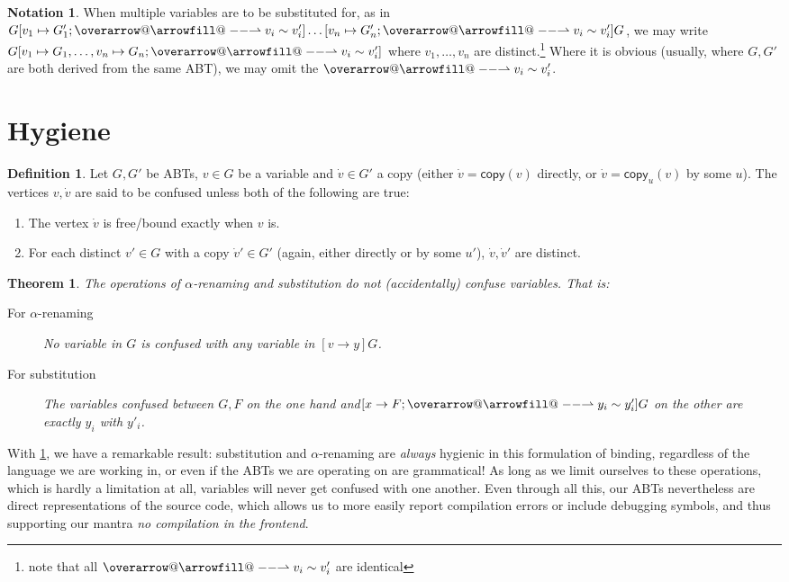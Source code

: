 \documentclass[11pt]{article} %
\makeatletter
\newtheorem{thm}{Theorem}
\theoremstyle{definition}
\newtheorem{dfn}{Definition}
\newtheorem*{ntn}{Notation}
\def\rightharpoonupfill@{\arrowfill@\relbar\relbar\rightharpoonup}
\newcommand{\harpvec}{%
   \mathpalette{\overarrow@\rightharpoonupfill@}}
\makeatother
\begin{document}
\begin{ntn}
When multiple variables are to be substituted for, as in $G[v_1 \mapsto G'_1; \harpvec{v_i \sim v'_i}]\ldots[v_n \mapsto G'_n; \harpvec{v_i \sim v'_i}]G$, we may write $G[v_1 \mapsto G_1, \ldots, v_n \mapsto G_n; \harpvec{v_i \sim v'_i}]$ where $v_1,\ldots,v_n$ are distinct.\footnote{note that all $\harpvec{v_i \sim v'_i}$ are identical}
Where it is obvious (usually, where $G, G'$ are both derived from the same ABT), we may omit the $\harpvec{v_i \sim v'_i}$.
\end{ntn}


\section{Hygiene}

\begin{dfn}
Let $G, G'$ be ABTs, $v \in G$ be a variable and $\dot v \in G'$ a copy (either $\dot v = \mathsf{copy}(v)$ directly, or $\dot v = \mathsf{copy}_u(v)$ by some $u$).
The vertices $v, \dot v$ are said to be confused unless both of the following are true:
\begin{enumerate}[label=\alph*)]
\item The vertex $\dot v$ is free/bound exactly when $v$ is.
\item For each distinct $v' \in G$ with a copy $\dot v' \in G'$ (again, either directly or by some $u'$), $\dot v, \dot v'$ are distinct.
\end{enumerate}
\end{dfn}


\begin{thm}
\label{thm:no-confusion}
The operations of $\alpha$-renaming and substitution do not (accidentally) confuse variables.
That is:
\begin{description}%
\item[For $\alpha$-renaming] No variable in $G$ is confused with any variable in $[v \to y]G$.
\item[For substitution] The variables confused between $G, F$ on the one hand and\newline$[x \to F; \harpvec{y_i \sim y'_i}]G$ on the other are exactly $y_i$ with $y'_i$.
\end{description}
\end{thm}

With \cref{thm:no-confusion}, we have a remarkable result:
substitution and $\alpha$-renaming are \emph{always} hygienic in this formulation of binding, regardless of the language we are working in, or even if the ABTs we are operating on are grammatical!
As long as we limit ourselves to these operations, which is hardly a limitation at all, variables will never get confused with one another.
Even through all this, our ABTs nevertheless are direct representations of the source code, which allows us to more easily report compilation errors or include debugging symbols, and thus supporting our mantra \emph{no compilation in the frontend}.
\end{document}
